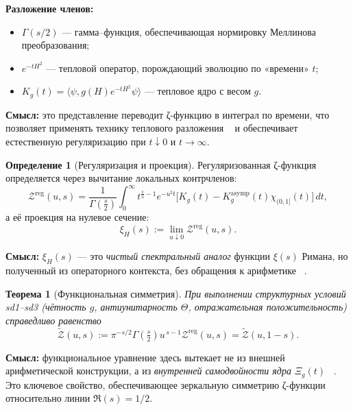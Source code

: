 \documentclass{article}
\numberwithin{equation}{section}
\theoremstyle{plain}
\newtheorem{theorem}{Теорема}
\theoremstyle{definition}
\newtheorem{definition}{Определение}
\theoremstyle{remark}
\def\infty{∞}\def\partial{∂}\def\sum{Σ}\def\int{∫}%
\begin{document}
\noindent
\textbf{Разложение членов:}
\begin{itemize}
  \item \(\Gamma(s/2)\) — гамма–функция, обеспечивающая нормировку Меллинова преобразования;
  \item \(e^{-tH^2}\) — тепловой оператор, порождающий эволюцию по «времени» \(t\);
  \item \(K_g(t)=\langle\psi,g(H)e^{-tH^2}\psi\rangle\) — тепловое ядро с весом \(g\).
\end{itemize}

\noindent
\textbf{Смысл:} это представление переводит ζ-функцию в интеграл по времени, 
что позволяет применять технику теплового разложения ~\cite{Vassilevich2003} и обеспечивает естественную регуляризацию
при \(t\downarrow 0\) и \(t\to\infty\).

\begin{definition}[Регуляризация и проекция]
\label{def:xiH}
Регуляризованная ζ-функция определяется через вычитание локальных контрчленов:
\begin{equation}
\mathcal Z^{\mathrm{reg}}(u,s)
=\frac{1}{\Gamma(\tfrac s2)}
\int_0^\infty t^{\frac s2-1}e^{-u^2t}
\Big[K_g(t)-K_g^{\mathrm{asymp}}(t)\chi_{(0,1]}(t)\Big]\,dt,
\end{equation}
а её проекция на нулевое сечение:
\begin{equation}
\boxed{
\xi_H(s):=\lim_{u\downarrow0}\mathcal Z^{\mathrm{reg}}(u,s).
}
\end{equation}
\end{definition}

\noindent
\textbf{Смысл:} $\xi_H(s)$ — это \emph{чистый спектральный аналог} функции $\xi(s)$ Римана,  
но полученный из операторного контекста, без обращения к арифметике ~\cite{Hawking1977}.

\begin{theorem}[Функциональная симметрия]
\label{thm:FE}
При выполнении структурных условий sd1–sd3 (чётность $g$, антиунитарность $\Theta$, отражательная положительность)
справедливо равенство
\begin{equation}
\boxed{
\widetilde{\mathcal Z}(u,s)
:=\pi^{-s/2}\Gamma\!\left(\tfrac s2\right)
u^{\,s-1}\mathcal Z^{\mathrm{reg}}(u,s)
=\widetilde{\mathcal Z}(u,1-s).
}
\end{equation}
\end{theorem}

\noindent
\textbf{Смысл:} функциональное уравнение здесь вытекает не из внешней арифметической конструкции, 
а из \emph{внутренней самодвойности ядра} $\Xi_g(t)$ ~\cite{Connes1999}.
Это ключевое свойство, обеспечивающее зеркальную симметрию ζ-функции относительно линии $\Re(s)=1/2$.
\end{document}
